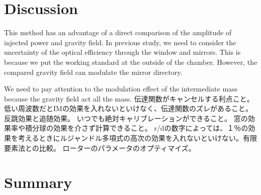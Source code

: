 \documentclass[12pt]{iopart}
\begin{document}
\section{Discussion}
This method has an advantage of a direct comparison of the amplitude of injected power and gravity field. In previous study, we need to consider the uncertainty of the optical efficiency through the window and mirrors. This is because we put the working standard at the outside of the chamber. However, the compared gravity field can modulate the mirror directory.

We need to pay attention to the modulation effect of the intermediate mass because the gravity field act all the mass. 
伝達関数がキャンセルする利点こと。低い周波数だとIMの効果を入れないといけなく、伝達関数のズレがあること。反跳効果と追随効果。
いつでも絶対キャリブレーションができること。
窓の効果率や積分球の効果を介さず計算できること。
r/dの数字によっては、１％の効果を考えるときにルジャンドル多項式の高次の効果を入れないといけない。有限要素法との比較。
ローターのパラメータのオプティマイズ。

\section{Summary}


\begin{verbatim}

\end{verbatim}
\end{document}

